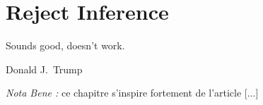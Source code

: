 \chapter{Reject Inference} \label{chap2}

\epigraph{Sounds good, doesn't work.}{Donald J.\ Trump}


\textit{Nota Bene :} ce chapitre s'inspire fortement de l'article [...]



\section{}




\printbibliography[heading=subbibliography, title=References of Chapter 2]